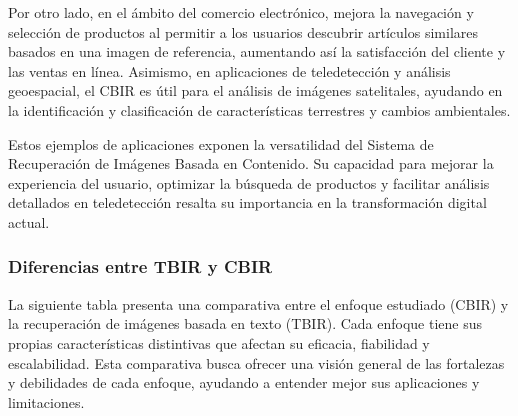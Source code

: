 Por otro lado, en el ámbito del comercio electrónico, mejora la navegación y selección de productos al permitir a los usuarios descubrir artículos similares basados en una imagen de referencia, aumentando así la satisfacción del cliente y las ventas en línea. Asimismo, en aplicaciones de teledetección y análisis geoespacial, el CBIR es útil para el análisis de imágenes satelitales, ayudando en la identificación y clasificación de características terrestres y cambios ambientales. \cite{li2021recent}

Estos ejemplos de aplicaciones exponen la versatilidad del Sistema de Recuperación de Imágenes Basada en Contenido. Su capacidad para mejorar la experiencia del usuario, optimizar la búsqueda de productos y facilitar análisis detallados en teledetección resalta su importancia en la transformación digital actual.

\subsubsection{Diferencias entre TBIR y CBIR}
La siguiente tabla presenta una comparativa entre el enfoque estudiado (CBIR) y la recuperación de imágenes basada en texto (TBIR). Cada enfoque tiene sus propias características distintivas que afectan su eficacia, fiabilidad y escalabilidad. Esta comparativa busca ofrecer una visión general de las fortalezas y debilidades de cada enfoque, ayudando a entender mejor sus aplicaciones y limitaciones.

